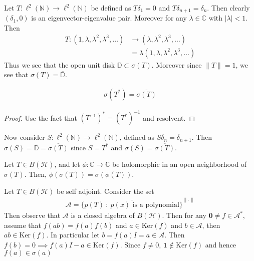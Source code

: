 

\begin{example}
  Let $T : \ell^{2}(\mathbb{N}) \to \ell^{2}(\mathbb{N})$ be defined as
  $T \delta_1 = 0$ and $T \delta_{n+1} = \delta_n$. Then clearly
  $(\delta_1, 0)$ is an eigenvector-eigenvalue pair. Moreover for any
  $\lambda \in \mathbb{C}$ with $|\lambda| < 1$. Then
  \begin{align*}
    T: (1, \lambda, \lambda^2, \lambda^3, \ldots) &\to  ( \lambda,
    \lambda^2, \lambda^3, \ldots) \\
    &= \lambda(1, \lambda, \lambda^2, \lambda^3, \ldots)
  \end{align*}
  Thus we see that the open unit disk $\mathbb{D} \subset \sigma(T)$.
  Moreover since $\|T\| = 1$, we see that $\sigma(T) = \overline{\mathbb{D}}$.
\end{example}

\begin{proposition}
  \begin{align*}
    \sigma(T^*) = \overline{\sigma(T)}
  \end{align*}
\end{proposition}
\begin{proof}
  Use the fact that $(T^{-1})^* = (T^*)^{-1}$ and resolvent.
\end{proof}

\begin{example}
  Now consider $S: \ell^{2}(\mathbb{N}) \to \ell^{2}(\mathbb{N})$,
  defined as $S \delta_n = \delta_{n+1}$. Then $\sigma(S) =
  \overline{\mathbb{D}} = \overline{\sigma(T)}$ since $S = T^*$ and
  $\sigma(S) = \overline{\sigma(T)}$.
\end{example}

\begin{theorem}
  Let $T \in B(\mathcal{H})$, and let $\phi: \mathbb{C} \to
  \mathbb{C}$ be holomorphic in an open neighborhood of $\sigma(T)$.
  Then, $\phi(\sigma(T)) = \sigma(\phi(T))$.
\end{theorem}

Let $T \in B(\mathcal{H})$ be self adjoint. Consider the set
\begin{align*}
  \mathcal{A} = \overline{\{ p(T)  \ : \   p(x) \textrm{ is a
  polynomial} \}}^{\|\cdot\|}
\end{align*}
Then observe that $\mathcal{A}$ is a closed algebra of
$B(\mathcal{H})$. Then for any $\textbf{0} \neq f \in \mathcal{A}^*$,
assume that $f(ab) = f(a)f(b)$ and $a \in \textrm{Ker}(f)$ and $b \in
\mathcal{A}$, then $ab \in \textrm{Ker}(f)$. In particular let $b =
f(a)I = a \in \mathcal{A}$. Then $f(b) = 0 \implies f(a) I - a \in
\textrm{Ker}(f)$. Since $f \neq 0$, $\textbf{1} \not\in
\textrm{Ker}(f)$ and hence $f(a) \in \sigma(a)$

